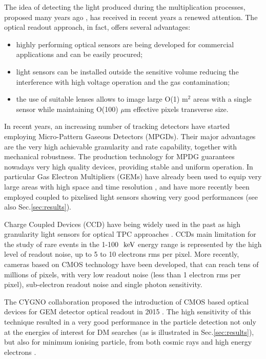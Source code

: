\documentclass[physics,article,submit,moreauthors,pdftex]{Definitions/mdpi}
\newcommand{\keV}{\ensuremath{\,\textrm{ke\hspace{-.08em}V}}\xspace}
\begin{document}
The idea of detecting the light produced during the multiplication processes, proposed many years ago \cite{bib:charpak}, has received in recent years a renewed attention. The optical readout approach, in fact, offers several advantages:
\begin{itemize}
\item highly performing optical sensors are being developed for commercial applications and can be easily procured;
\item light sensors can be installed outside the sensitive volume reducing the interference with high voltage operation and the gas contamination;
\item the use of suitable lenses allows to image large O(1) m$^2$ areas with a single sensor while maintaining O(100) $\mu$m effective pixels transverse size.
\end{itemize}

In recent years, an increasing number of tracking detectors have started employing 
Micro-Pattern Gaseous Detectors (MPGDs). Their major advantages are the very high achievable granularity and rate capability, together with mechanical robustness. The production technology for MPDG guarantees nowadays very high quality devices, providing stable and uniform operation. In particular Gas Electron Multipliers (GEMs) \cite{bib:gem} have already been used to equip very large areas with high space and time resolution \cite{bib:alice}, and have more recently been employed coupled to pixelised light sensors showing very good performances \cite{bib:ref1, bib:jinst_orange1, bib:loomba, bib:Fraga} (see also Sec.\ref{sec:results}). 

Charge Coupled Devices (CCD) have being widely used in the past as high granularity light sensors for optical TPC approaches \citep{bib:ccd1, bib:loomba, bib:ccd2}. CCDs main limitation for the study of rare events in the 1-100~\keV energy range is represented by the high level of readout noise, up to 5 to 10 electrons rms per pixel. More recently, cameras based on CMOS technology have been developed, that can reach tens of millions of pixels, with very low readout noise (less than 1 electron rms per pixel), sub-electron readout noise and single photon sensitivity. 

The CYGNO collaboration proposed the introduction of CMOS based optical devices for GEM detector optical readout in 2015  \cite{bib:nim_orange1}. The high sensitivity of this technique resulted in a very good performance in the particle detection not only at the energies of interest for DM searches (as is illustrated in Sec.\ref{sec:results}), but also for minimum ionising particle, from both cosmic rays and high energy electrons  \cite{ bib:jinst_orange1, bib:jinst_orange2, bib:ieee_orange, bib:elba, bib:lemon_btf}. 
\end{document}
